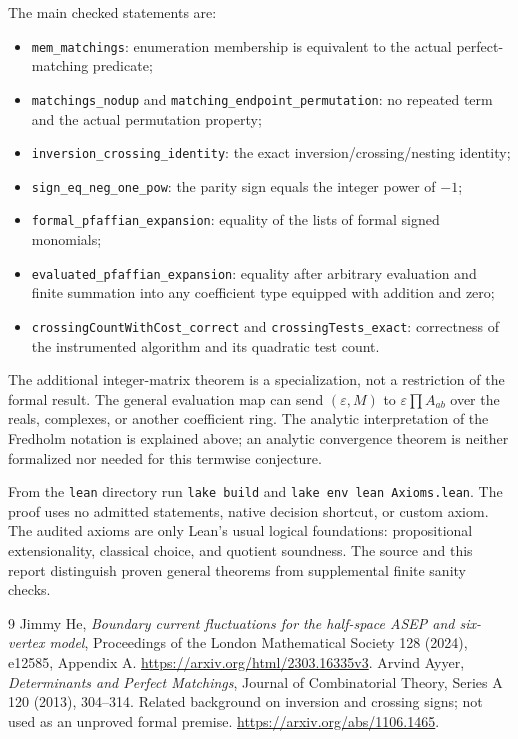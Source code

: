 \documentclass[11pt]{article}
\begin{document}
The main checked statements are:
\begin{itemize}
\item \texttt{mem\_matchings}: enumeration membership is equivalent to the actual perfect-matching predicate;
\item \texttt{matchings\_nodup} and \texttt{matching\_endpoint\_permutation}: no repeated term and the actual permutation property;
\item \texttt{inversion\_crossing\_identity}: the exact inversion/crossing/nesting identity;
\item \texttt{sign\_eq\_neg\_one\_pow}: the parity sign equals the integer power of $-1$;
\item \texttt{formal\_pfaffian\_expansion}: equality of the lists of formal signed monomials;
\item \texttt{evaluated\_pfaffian\_expansion}: equality after arbitrary evaluation and finite summation into any coefficient type equipped with addition and zero;
\item \texttt{crossingCountWithCost\_correct} and \texttt{crossingTests\_exact}: correctness of the instrumented algorithm and its quadratic test count.
\end{itemize}
The additional integer-matrix theorem is a specialization, not a restriction of the formal result. The general evaluation map can send $(\varepsilon,M)$ to $\varepsilon\prod A_{ab}$ over the reals, complexes, or another coefficient ring. The analytic interpretation of the Fredholm notation is explained above; an analytic convergence theorem is neither formalized nor needed for this termwise conjecture.

From the \texttt{lean} directory run \texttt{lake build} and \texttt{lake env lean Axioms.lean}. The proof uses no admitted statements, native decision shortcut, or custom axiom. The audited axioms are only Lean's usual logical foundations: propositional extensionality, classical choice, and quotient soundness. The source and this report distinguish proven general theorems from supplemental finite sanity checks.

\begin{thebibliography}{9}
 Jimmy He, \emph{Boundary current fluctuations for the half-space ASEP and six-vertex model}, Proceedings of the London Mathematical Society 128 (2024), e12585, Appendix A. \url{https://arxiv.org/html/2303.16335v3}.
 Arvind Ayyer, \emph{Determinants and Perfect Matchings}, Journal of Combinatorial Theory, Series A 120 (2013), 304--314. Related background on inversion and crossing signs; not used as an unproved formal premise. \url{https://arxiv.org/abs/1106.1465}.
\end{thebibliography}
\end{document}
